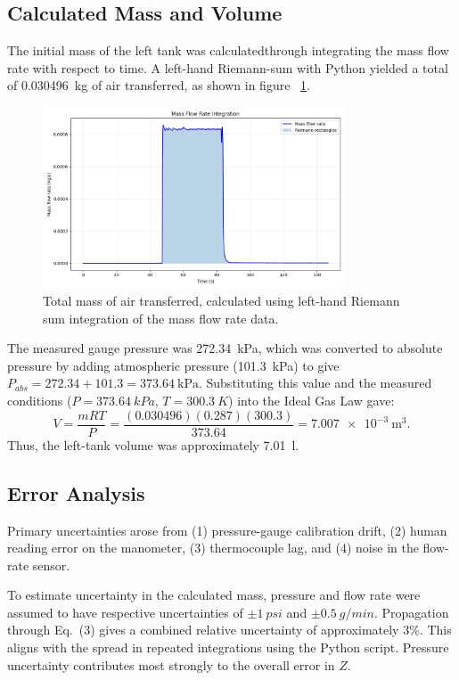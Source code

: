 \documentclass[12pt]{article}
\begin{document}
\subsection*{Calculated Mass and Volume}

The initial mass of the left tank was calculatedthrough integrating the mass flow rate with respect to time. A left-hand Riemann-sum with Python \cite{integrate_script} yielded a total of \SI{0.030496}{\kilogram} of air transferred, as shown in figure ~\ref{fig:massintegration}.
\begin{figure}[h!]
\centering
\includegraphics[width=0.8\textwidth]{massintegration.png}
\caption{Total mass of air transferred, calculated using left-hand Riemann sum integration of the mass flow rate data.}
\label{fig:massintegration}
\end{figure}
The measured gauge pressure was \SI{272.34}{\kPa}, which was converted to absolute pressure by adding atmospheric pressure (\SI{101.3}{\kPa}) to give \(P_{abs} = 272.34 + 101.3 = \SI{373.64}{\kPa}\). Substituting this value and the measured conditions (\(P = 373.64~\si{kPa}\), \(T = 300.3~\si{K}\)) into the Ideal Gas Law gave:
\[
V = \frac{mRT}{P} =
\frac{(0.030496)(0.287)(300.3)}{373.64} =
\SI{7.007e-3}{\metre\cubed}.
\]
Thus, the left-tank volume was approximately \SI{7.01}{\litre}.


\subsection*{Error Analysis}
Primary uncertainties arose from (1) pressure-gauge calibration drift, (2) human reading error on the manometer, (3) thermocouple lag, and (4) noise in the flow-rate sensor.  

To estimate uncertainty in the calculated mass, pressure and flow rate were assumed to have respective uncertainties of \(\pm1~\si{psi}\) and \(\pm0.5~\si{g/min}\). 
Propagation through Eq.~(3) gives a combined relative uncertainty of approximately \(3\%\). 
This aligns with the spread in repeated integrations using the Python script. 
Pressure uncertainty contributes most strongly to the overall error in \(Z\).  
\end{document}
